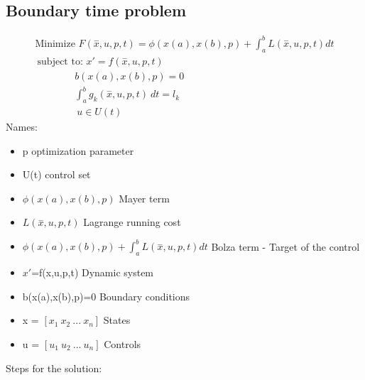 \documentclass[a4paper,12pt]{article}
\begin{document}
	\subsection{Boundary time problem}
	\begin{gather*}
		\text{Minimize } F(\stackrel{-}{x},u,p,t)=\phi(x(a),x(b),p)+\int_{a}^{b}L(\stackrel{-}{x},u,p,t)dt  \\\
		\text{subject to: } x'=f(\stackrel{-}{x},u,p,t)\\
		\ \ \ \ \ \ \ \ \ \ \ \ \ \ \ \ \ \ b(x(a),x(b),p)=0\\
		\ \ \ \ \ \ \ \ \ \ \ \ \ \ \ \ \ \ \int_{a}^{b}g_k(\stackrel{-}{x},u,p,t) \ dt = l_k\\
		\ \ \ \ \ \ \ \ \ \ \ \ \ \ \ \ \ \ \ u \in U(t)
	\end{gather*}
	Names:
	\begin{itemize}
		\item p optimization parameter
		\item U(t) control set
		\item $\phi(x(a),x(b),p)$ Mayer term
		\item $L(\stackrel{-}{x},u,p,t)$ Lagrange running cost
		\item $\phi(x(a),x(b),p)+\int_{a}^{b}L(\stackrel{-}{x},u,p,t)dt$ Bolza term - Target of the control
		\item $x'$=f(x,u,p,t) Dynamic system
		\item  b(x(a),x(b),p)=0 Boundary conditions
		\item x = $\left[ x_1 \ x_2 \ ... \ x_n  \right] $ States
		\item u = $\left[ u_1 \ u_2 \ ... \ u_n  \right] $ Controls
	\end{itemize}
	Steps for the solution:\\
\end{document}
